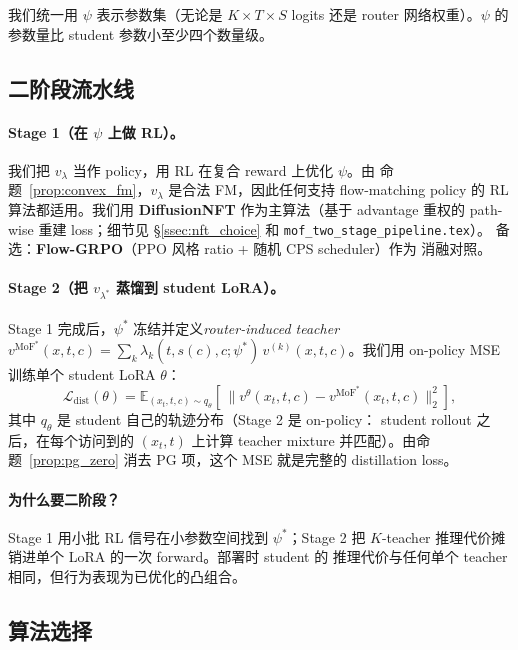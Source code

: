 \documentclass[11pt,a4paper]{article}
\newcommand{\loss}{\mathcal{L}}
\newcommand{\E}{\mathbb{E}}
\newcommand{\MoF}{\mathrm{MoF}}
\theoremstyle{definition}
\begin{document}
我们统一用 $\psi$ 表示参数集（无论是 $K\!\times\!T\!\times\!S$ logits
还是 router 网络权重）。$\psi$ 的参数量比 student 参数小至少四个数量级。

\subsection{二阶段流水线}
\label{ssec:two_stage}

\paragraph{Stage 1（在 $\psi$ 上做 RL）。}
我们把 $v_\lambda$ 当作 policy，用 RL 在复合 reward 上优化 $\psi$。由
命题~\ref{prop:convex_fm}，$v_\lambda$ 是合法 FM，因此任何支持
flow-matching policy 的 RL 算法都适用。我们用 \textbf{DiffusionNFT}
作为主算法（基于 advantage 重权的 path-wise 重建 loss；细节见
\S\ref{ssec:nft_choice} 和 \texttt{mof\_two\_stage\_pipeline.tex}）。
备选：\textbf{Flow-GRPO}（PPO 风格 ratio + 随机 CPS scheduler）作为
消融对照。

\paragraph{Stage 2（把 $v_{\lambda^*}$ 蒸馏到 student LoRA）。}
Stage 1 完成后，$\psi^*$ 冻结并定义\emph{router-induced teacher}
$v^{\MoF^*}(x, t, c) = \sum_k \lambda_k(t, s(c), c; \psi^*)\,
v^{(k)}(x, t, c)$。我们用 on-policy MSE 训练单个 student LoRA $\theta$：
\begin{equation}
\loss_{\text{dist}}(\theta) =
\E_{(x_t,t,c)\sim q_\theta}\!\left[\,
\big\| v^\theta(x_t,t,c) - v^{\MoF^*}(x_t,t,c) \big\|_2^2
\right],
\label{eq:distill_loss}
\end{equation}
其中 $q_\theta$ 是 student 自己的轨迹分布（Stage 2 是 on-policy：
student rollout 之后，在每个访问到的 $(x_t, t)$ 上计算 teacher mixture
并匹配）。由命题~\ref{prop:pg_zero} 消去 PG 项，这个 MSE 就是完整的
distillation loss。

\paragraph{为什么要二阶段？}
Stage 1 用小批 RL 信号在小参数空间找到 $\psi^*$；Stage 2 把
$K$-teacher 推理代价摊销进单个 LoRA 的一次 forward。部署时 student 的
推理代价与任何单个 teacher 相同，但行为表现为已优化的凸组合。

\subsection{算法选择}
\end{document}
